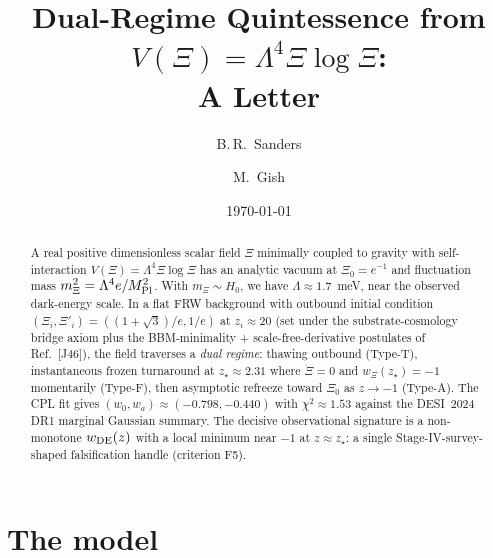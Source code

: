 \documentclass[aps,prl,reprint,floatfix,nofootinbib]{revtex4-2}
\newcommand{\Mpl}{M_{\rm Pl}}
\newcommand{\zstar}{z_\star}
\newcommand{\wDE}{w_{\rm DE}}
\begin{document}
\title{Dual-Regime Quintessence from $V(\Xi) = \Lambda^4 \Xi\log\Xi$:\\
A Letter}

\author{B.\,R.\ Sanders}

\author{M.\ Gish}

\date{\today}

\begin{abstract}
A real positive dimensionless scalar field $\Xi$ minimally
coupled to gravity with self-interaction $V(\Xi) = \Lambda^4
\Xi\log\Xi$ has an analytic vacuum at $\Xi_0 = e^{-1}$ and
fluctuation mass $m_\Xi^2 = \Lambda^4 e/\Mpl^2$. With
$m_\Xi \sim H_0$, we have $\Lambda \approx 1.7$~meV, near the
observed dark-energy scale. In a flat FRW background with
outbound initial condition $(\Xi_i, \Xi'_i) = ((1+\sqrt{3})/e,
1/e)$ at $z_i \approx 20$ (set under the substrate-cosmology
bridge axiom plus the BBM-minimality + scale-free-derivative
postulates of Ref.~[J46]), the field traverses a \emph{dual
regime}: thawing outbound (Type-T), instantaneous frozen
turnaround at $\zstar \approx 2.31$ where $\dot\Xi = 0$ and
$w_\Xi(\zstar) = -1$ momentarily (Type-F), then asymptotic
refreeze toward $\Xi_0$ as $z \to -1$ (Type-A). The CPL fit
gives $(w_0, w_a) \approx (-0.798, -0.440)$ with $\chi^2
\approx 1.53$ against the DESI~2024 DR1 marginal Gaussian
summary. The decisive observational signature is a
non-monotone $\wDE(z)$ with a local minimum near $-1$ at
$z \approx \zstar$: a single Stage-IV-survey-shaped
falsification handle (criterion F5).
\end{abstract}

\maketitle

\section{The model}\label{sec:model}
\end{document}
